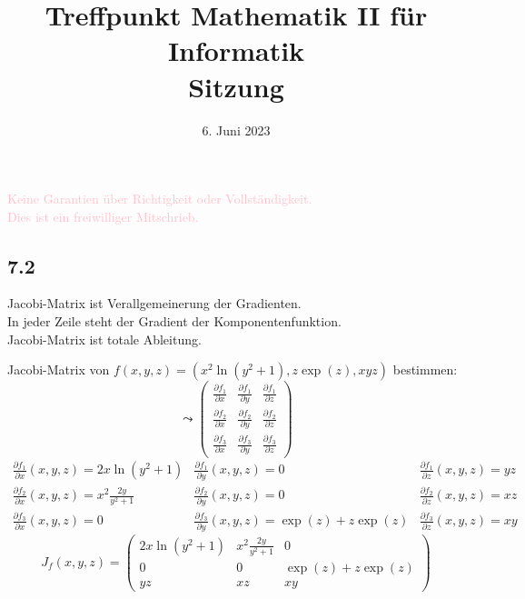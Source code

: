 \documentclass[
    accentcolor=pink,
    boxarc,
    dark_mode,
    logofile=enmpty
]{rubos-tuda-template}
\date{6. Juni 2023}
\title[trans rights <3]{Treffpunkt Mathematik II für Informatik \\ Sitzung \getSheetnumber{}}
\begin{document}
    \maketitle{}
    \begin{anmerkung}
        \huge{\textcolor{pink}{Keine Garantien über Richtigkeit oder Vollständigkeit. \\ Dies ist ein freiwilliger Mitschrieb.}}
    \end{anmerkung}

    \subsection*{7.2}
    \begin{anmerkungen}
        Jacobi-Matrix ist Verallgemeinerung der Gradienten.\\
        In jeder Zeile steht der Gradient der Komponentenfunktion.\\
        Jacobi-Matrix ist totale Ableitung.
    \end{anmerkungen}
    Jacobi-Matrix von \(f(x,y,z) = (x^2\ln(y^2+1), z\exp(z), xyz)\) bestimmen:
    \[\leadsto \begin{pmatrix}
            \frac{\partial f_1}{\partial x} & \frac{\partial f_1}{\partial y} & \frac{\partial f_1}{\partial z} \\
            \frac{\partial f_2}{\partial x} & \frac{\partial f_2}{\partial y} & \frac{\partial f_2}{\partial z} \\
            \frac{\partial f_3}{\partial x} & \frac{\partial f_3}{\partial y} & \frac{\partial f_3}{\partial z}
        \end{pmatrix}\]
    \[\begin{matrix}
            \frac{\partial f_1}{\partial x}(x,y,z) = 2x\ln(y^2+1)        & \frac{\partial f_1}{\partial y}(x,y,z) = 0                  & \frac{\partial f_1}{\partial z}(x,y,z) = yz \\
            \frac{\partial f_2}{\partial x}(x,y,z) = x^2\frac{2y}{y^2+1} & \frac{\partial f_2}{\partial y}(x,y,z) = 0                  & \frac{\partial f_2}{\partial z}(x,y,z) = xz \\
            \frac{\partial f_3}{\partial x}(x,y,z) = 0                   & \frac{\partial f_3}{\partial y}(x,y,z) = \exp(z) + z\exp(z) & \frac{\partial f_3}{\partial z}(x,y,z) = xy
        \end{matrix}\]
    \[J_f(x,y,z)=\begin{pmatrix}
            2x\ln(y^2+1) & x^2\frac{2y}{y^2+1} & 0                  \\
            0            & 0                   & \exp(z) + z\exp(z) \\
            yz           & xz                  & xy
        \end{pmatrix}\]
    \clearpage
\end{document}
